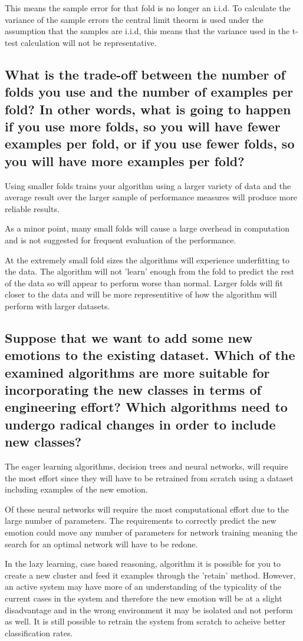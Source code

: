 \documentclass[11pt]{article}
\begin{document}
This means the sample error for that fold is no longer an i.i.d. To calculate the variance of the sample errors the central limit theorm is used under the assumption that the samples are i.i.d, this means that the variance used in the t-test calculation will not be representative.

\subsection{What is the trade-off between the number of folds you use and the number of examples per fold? In other words, what is going to happen if you use more folds, so you will have fewer examples per fold, or if you use fewer folds, so you will have more examples per fold?}

Using smaller folds trains your algorithm using a larger variety of data and the average result over the larger sample of performance measures will produce more reliable results.

As a minor point, many small folds will cause a large overhead in computation and is not suggested for frequent evaluation of the performance. 

At the extremely small fold sizes the algorithms will experience underfitting to the data. The algorithm will not 'learn' enough from the fold to predict the rest of the data so will appear to perform worse than normal. Larger folds will fit closer to the data and will be more representitive of how the algorithm will perform with larger datasets. 

\subsection{Suppose that we want to add some new emotions to the existing dataset. Which of the examined algorithms are more suitable for incorporating the new classes in terms of engineering effort? Which algorithms need to undergo radical changes in order to include new classes?}

The eager learning algorithms, decision trees and neural networks, will require the most effort since they will have to be retrained from scratch using a dataset including examples of the new emotion. 

Of these neural networks will require the most computational effort due to the large number of parameters. The requirements to correctly predict the new emotion could move any number of parameters for network training meaning the search for an optimal network will have to be redone.

In the lazy learning, case based reasoning, algorithm it is possible for you to create a new cluster and feed it examples through the 'retain' method. However, an active system may have more of an understanding of the typicality of the current cases in the system and therefore the new emotion will be at a slight disadvantage and in the wrong environment it may be isolated and not perform as well. It is still possible to retrain the system from scratch to acheive better classification rates.
\end{document}
